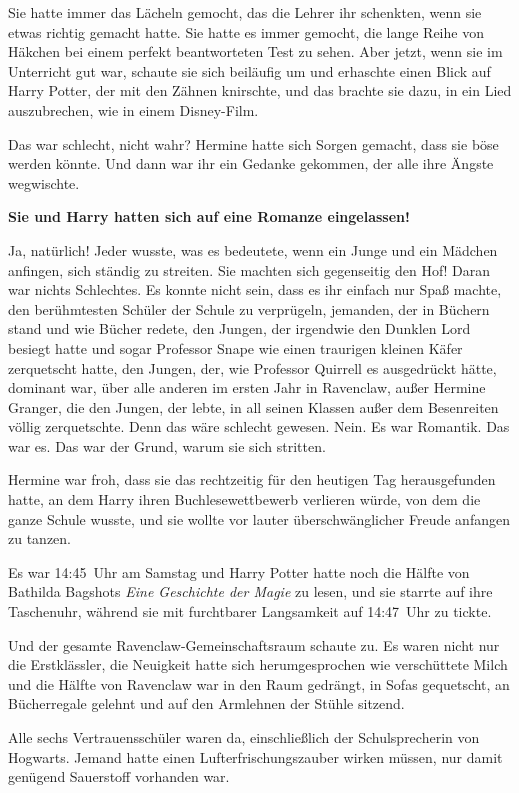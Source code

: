 {Sie hatte immer das Lächeln gemocht, das die Lehrer ihr schenkten, wenn sie etwas richtig gemacht hatte. Sie hatte es immer gemocht, die lange Reihe von Häkchen bei einem perfekt beantworteten Test zu sehen. Aber jetzt, wenn sie im Unterricht gut war, schaute sie sich beiläufig um und erhaschte einen Blick auf Harry Potter, der mit den Zähnen knirschte, und das brachte sie dazu, in ein Lied auszubrechen, wie in einem Disney-Film.

Das war schlecht, nicht wahr? Hermine hatte sich Sorgen gemacht, dass sie böse werden könnte. Und dann war ihr ein Gedanke gekommen, der alle ihre Ängste wegwischte.

\textbf{Sie und Harry hatten sich auf eine Romanze eingelassen!}

Ja, natürlich! Jeder wusste, was es bedeutete, wenn ein Junge und ein Mädchen anfingen, sich ständig zu streiten. Sie machten sich gegenseitig den Hof! Daran war nichts Schlechtes. Es konnte nicht sein, dass es ihr einfach nur Spaß machte, den berühmtesten Schüler der Schule zu verprügeln, jemanden, der in Büchern stand und wie Bücher redete, den Jungen, der irgendwie den Dunklen Lord besiegt hatte und sogar Professor Snape wie einen traurigen kleinen Käfer zerquetscht hatte, den Jungen, der, wie Professor Quirrell es ausgedrückt hätte, dominant war, über alle anderen im ersten Jahr in Ravenclaw, außer Hermine Granger, die den Jungen, der lebte, in all seinen Klassen außer dem Besenreiten völlig zerquetschte. Denn das wäre schlecht gewesen. Nein. Es war Romantik. Das war es. Das war der Grund, warum sie sich stritten.

Hermine war froh, dass sie das rechtzeitig für den heutigen Tag herausgefunden hatte, an dem Harry ihren Buchlesewettbewerb verlieren würde, von dem die ganze Schule wusste, und sie wollte vor lauter überschwänglicher Freude anfangen zu tanzen.

Es war 14:45~Uhr am Samstag und Harry Potter hatte noch die Hälfte von Bathilda Bagshots \emph{Eine Geschichte der Magie} zu lesen, und sie starrte auf ihre Taschenuhr, während sie mit furchtbarer Langsamkeit auf 14:47~Uhr zu tickte.

Und der gesamte Ravenclaw-Gemeinschaftsraum schaute zu. Es waren nicht nur die Erstklässler, die Neuigkeit hatte sich herumgesprochen wie verschüttete Milch und die Hälfte von Ravenclaw war in den Raum gedrängt, in Sofas gequetscht, an Bücherregale gelehnt und auf den Armlehnen der Stühle sitzend.

Alle sechs Vertrauensschüler waren da, einschließlich der Schulsprecherin von Hogwarts. Jemand hatte einen Lufterfrischungszauber wirken müssen, nur damit genügend Sauerstoff vorhanden war.

}
